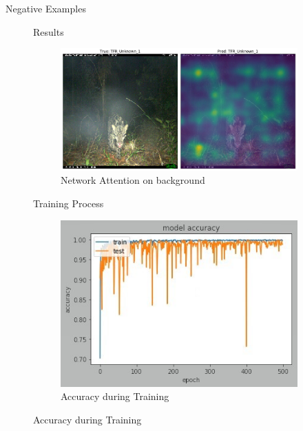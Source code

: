 \documentclass[10pt]{beamer}
\begin{document}
\begin{frame}{Negative Examples}
\begin{figure}
\begin{frame}{Results}
	\centering
	\begin{figure}
		\includegraphics[width=\columnwidth]{images/result_leo_2.png}
		\caption{Network Attention on background}
	\end{figure}
\end{frame}


\begin{frame}{Training Process}
	\centering
	\begin{figure}
		\includegraphics[width=.9\columnwidth,height=\textheight,keepaspectratio]{images/Pretrain_acc_ResNet50_cropped_heavy_augment_lr0_0001.jpg}
		\caption{Accuracy during Training}
	\end{figure}
\end{frame}




\end{figure}
\end{frame}
\end{document}
